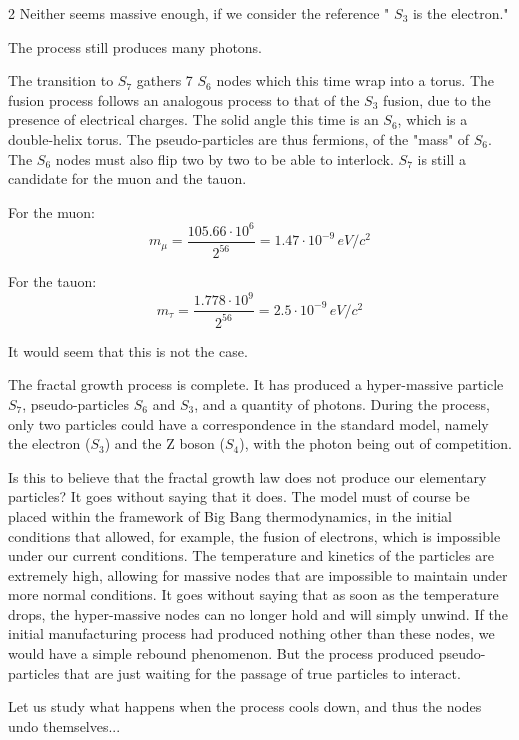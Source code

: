 \begin{multicols}{2}
	Neither seems massive enough, if we consider the reference " $S_3$ is the electron."
	
	The process still produces many photons.
	
	The transition to $S_7$ gathers 7 $S_6$ nodes which this time wrap into a torus. The fusion process follows an analogous process to that of the $S_3$ fusion, due to the presence of electrical charges. The solid angle this time is an $S_6$, which is a double-helix torus. The pseudo-particles are thus fermions, of the "mass" of $S_6$. The $S_6$ nodes must also flip two by two to be able to interlock. $S_7$ is still a candidate for the muon and the tauon.
	
	For the muon:
	\begin{equation*}
		m_{\mu} = \frac{105.66 \cdot 10^6} {2^{56}} = 1.47 \cdot 10^{-9}\,eV/c^2
	\end{equation*}
	
	For the tauon:
	\begin{equation*}
		m_{\tau} = \frac{1.778 \cdot 10^9}{2^{56}} = 2.5 \cdot 10^{-9}\,eV/c^2
	\end{equation*}
	
	It would seem that this is not the case.
	\medskip
	
	The fractal growth process is complete. It has produced a hyper-massive particle $S_7$, pseudo-particles $S_6$ and $S_3$, and a quantity of photons. During the process, only two particles could have a correspondence in the standard model, namely the electron ($S_3$) and the Z boson ($S_4$), with the photon being out of competition.
	
	Is this to believe that the fractal growth law does not produce our elementary particles? It goes without saying that it does. The model must of course be placed within the framework of Big Bang thermodynamics, in the initial conditions that allowed, for example, the fusion of electrons, which is impossible under our current conditions. The temperature and kinetics of the particles are extremely high, allowing for massive nodes that are impossible to maintain under more normal conditions. It goes without saying that as soon as the temperature drops, the hyper-massive nodes can no longer hold and will simply unwind. If the initial manufacturing process had produced nothing other than these nodes, we would have a simple rebound phenomenon. But the process produced pseudo-particles that are just waiting for the passage of true particles to interact.
	\medskip
	
	Let us study what happens when the process cools down, and thus the nodes undo themselves...
	

\end{multicols}
